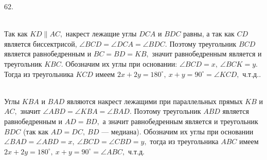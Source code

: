 \documentclass[12pt]{article}
\begin{document}
62. \begin{figure}[ht!]
\end{figure}\\
Так как $KD\parallel AC,$ накрест лежащие углы $DCA$ и $BDC$ равны, а так как $CD$ является биссектрисой, $\angle BCD=\angle DCA=\angle BDC.$ Поэтому треугольник $BCD$ является равнобедренным и $BC=BD=KB,$ значит равнобедренным является и треугольник $KBC.$ Обозначим их углы при основании: $\angle BCD=x,\ \angle BCK=y.$ Тогда из треугольника $KCD$ имеем $2x+2y=180^\circ,\ x+y=90^\circ=\angle KCD,$ ч.т.д.\newpage{}. \begin{figure}[ht!]
\end{figure}\\
Углы $KBA$ и $BAD$ являются накрест лежащими при параллельных прямых $KB$ и $AC,$ значит $\angle ABD=\angle KBA=\angle BAD.$ Поэтому треугольник $ABD$ является равнобедренным и $AD=BD,$ а значит равнобедренным является и треугольник $BDC$ (так как $AD=DC,\ BD$ --- медиана). Обозначим их углы при основании $\angle BAD=\angle ABD=x,\ \angle BCD=\angle CBD=y,$ тогда из треугольника $ABC$ имеем $2x+2y=180^\circ,\ x+y=90^\circ=\angle ABC,$ ч.т.д.\\
\end{document}
